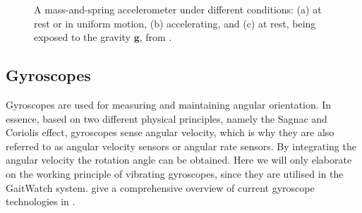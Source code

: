 \begin{figure}
\centering
{}
\caption{A mass-and-spring accelerometer under different conditions: (a) at rest or in uniform motion, (b) accelerating, and (c) at rest, being exposed to the gravity $\mathbf{g}$, from \cite{bhattacharyya_inertial_sensors_applications_13}.}
	\label{fig:accelerometer}
\end{figure}


\subsection{Gyroscopes}

Gyroscopes are used for measuring and maintaining angular orientation. In essence, based on two different physical principles, namely the Sagnac and Coriolis effect, gyroscopes sense angular velocity, which is why they are also referred to as angular velocity sensors or angular rate sensors. By integrating the angular velocity the rotation angle can be obtained. Here we will only elaborate on the working principle of vibrating gyroscopes, since they are utilised in the GaitWatch system. \citeauthor{armenise2010advances} give a comprehensive overview of current gyroscope technologies in \cite{armenise2010advances}.

